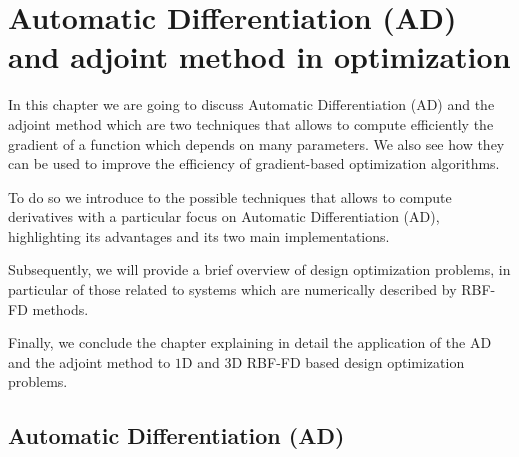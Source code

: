 \chapter{Automatic Differentiation (AD) and adjoint method in optimization}
\label{chap:adjoint_method_chapter}

In this chapter we are going to discuss Automatic Differentiation (AD) and the adjoint method which are two techniques that allows to compute efficiently the gradient of a function which depends on many parameters. We also see how they can be used to improve the efficiency of gradient-based optimization algorithms.

To do so we introduce to the possible techniques that allows to compute derivatives with a particular focus on Automatic Differentiation (AD), highlighting its advantages and its two main implementations.

Subsequently, we will provide a brief overview of design optimization problems, in particular of those related to systems which are numerically described by RBF-FD methods.

Finally, we conclude the chapter explaining in detail the application of the AD and the adjoint method to $1$D and $3$D RBF-FD based design optimization problems.

\section{Automatic Differentiation (AD)}

